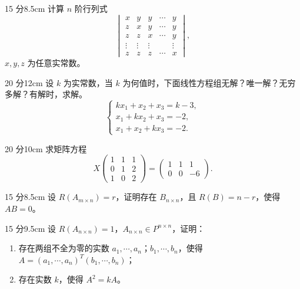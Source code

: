 
\begin{problem}{15 分}{8.5cm}
计算 $n$ 阶行列式
\[
\begin{vmatrix}
x&y&y&\cdots&y\\
z&x&y&\cdots&y\\
z&z&x&\cdots&y\\
\vdots&\vdots&\vdots&&\vdots\\
z&z&z&\cdots&x
\end{vmatrix},
\]
$x,y,z$ 为任意实常数。
\end{problem}

\begin{problem}{20 分}{12cm}
设 $k$ 为实常数，当 $k$ 为何值时，下面线性方程组无解？唯一解？无穷多解？有解时，求解。
\[
\begin{cases}
kx_1+x_2+x_3=k-3,\\
x_1+kx_2+x_3=-2,\\
x_1+x_2+kx_3=-2.
\end{cases}
\]
\end{problem}

\begin{problem}{20 分}{10cm}
求矩阵方程
\[
X\begin{pmatrix}1&1&1\\0&1&2\\1&0&2\end{pmatrix}=\begin{pmatrix}1&1&1\\0&0&-6\end{pmatrix}.
\]
\end{problem}

\begin{problem}{15 分}{8.5cm}
设 $R(A_{m\times n})=r$，证明存在 $B_{n\times n}$，且 $R(B)=n-r$，使得 $AB=0$。
\end{problem}

\begin{problem}{15 分}{9.5cm}
设 $R(A_{n\times n})=1$，$A_{n\times n}\in P^{n\times n}$，证明：
\begin{enumerate}[label=(\arabic*),leftmargin=2.2em,itemsep=0.25em,topsep=0.3em]
  \item 存在两组不全为零的实数 $a_1,\cdots,a_n$；$b_1,\cdots,b_n$，使得 $A=(a_1,\cdots,a_n)^{T}(b_1,\cdots,b_n)$；
  \item 存在实数 $k$，使得 $A^{2}=kA$。
\end{enumerate}
\end{problem}

